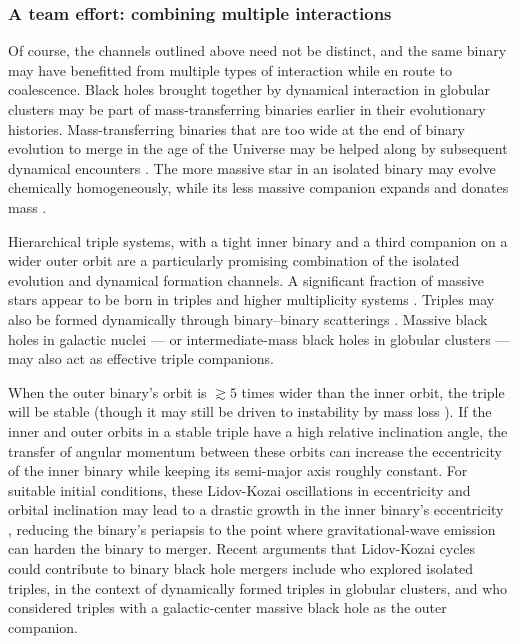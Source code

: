 \documentclass[iop,onecolumn]{revtex4}
\begin{document}
\subsubsection{A team effort: combining multiple interactions}

Of course, the channels outlined above need not be distinct, and the same binary may have benefitted from multiple types of interaction while en route to coalescence.  Black holes brought together by dynamical interaction in globular clusters may be part of mass-transferring binaries earlier in their evolutionary histories.  Mass-transferring binaries that are too wide at the end of binary evolution to merge in the age of the Universe may be helped along by subsequent dynamical encounters \citep[e.g.,][]{Belczynski:2014VMS}.  The more massive star in an isolated binary may evolve chemically homogeneously, while its less massive companion expands and donates mass \citep{Marchant:2017}.

Hierarchical triple systems, with a tight inner binary and a third companion on a wider outer orbit are a particularly promising combination of the isolated evolution and dynamical formation channels.  A significant fraction of massive stars appear to be born in triples and higher multiplicity systems \citep{DucheneKraus:2013}.  Triples may also be formed dynamically through binary--binary scatterings \citep{MillerHamilton:2002b}.  Massive black holes in galactic nuclei --- or intermediate-mass black holes in globular clusters --- may also act as effective triple companions.   

When the outer binary's orbit is $\gtrsim 5$ times wider than the inner orbit, the triple will be stable (though it may still be driven to instability by mass loss \citep[e.g.,][]{PeretsKratter:2012}).  If the inner and outer orbits in a stable triple have a high relative inclination angle, the transfer of angular momentum between these orbits can increase the eccentricity of the inner binary while keeping its semi-major axis roughly constant. For suitable initial conditions, these Lidov-Kozai oscillations in eccentricity and orbital inclination \citep{Lidov:1962,Kozai:1962} may lead to a drastic growth in the inner binary's eccentricity \citep[for a review, see][]{Naoz:2016}, reducing the binary's periapsis to the point where gravitational-wave emission can harden the binary to merger.  Recent arguments that Lidov-Kozai cycles could contribute to binary black hole mergers include \citet{SilbeeTremaine:2017} who explored isolated triples, \citet{Antonini:2016} in the context of dynamically formed triples in globular clusters, and \citet{Hoang:2018} who considered triples with a galactic-center massive black hole as the outer companion.
\end{document}
